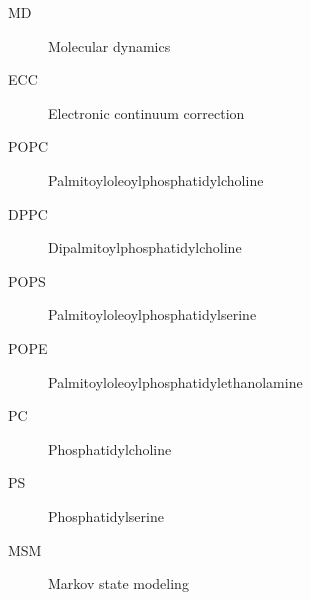 \documentclass[12pt,a4paper]{report}
\begin{document}
\newlength{\figwidth}
\setlength{\figwidth}{9 cm} 
\newlength{\figwidthsmall}
\setlength{\figwidthsmall}{6 cm} 




\tableofcontents










\listoffigures

\listoftables


\begin{description}   %
\item [MD]   Molecular dynamics
\item [ECC]  Electronic continuum correction
\item [POPC] Palmitoyloleoylphosphatidylcholine
\item [DPPC] Dipalmitoylphosphatidylcholine
\item [POPS] Palmitoyloleoylphosphatidylserine
\item [POPE] Palmitoyloleoylphosphatidylethanolamine
\item [PC]   Phosphatidylcholine
\item [PS]   Phosphatidylserine
\item [MSM]  Markov state modeling
\end{description}


\appendix
\end{document}
